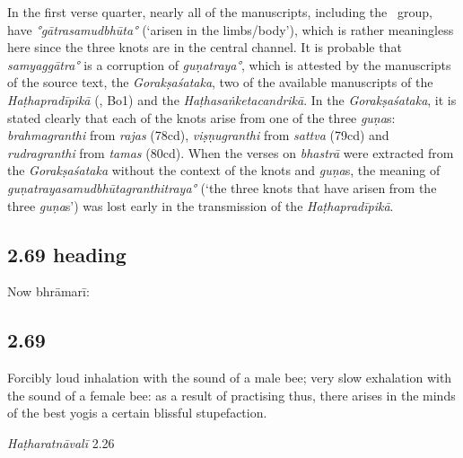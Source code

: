 \begin{ekdosis}
\begin{testimonia}[hp02_068]
\end{testimonia}

\begin{philcomm}[hp02_068]
In the first verse quarter, nearly all of the manuscripts, including the \textalpha\ group, have \emph{°gātrasamudbhūta°} (`arisen in the limbs/body'), which is rather meaningless here since the three knots are in the central channel. It is probable that \emph{samyaggātra°} is a corruption of \emph{guṇatraya°}, which is attested by the manuscripts of the source text, the \emph{Gorakṣaśataka}, two of the available manuscripts of the \emph{Haṭhapradīpikā} (, Bo1) and the \emph{Haṭhasaṅketacandrikā}. In the \emph{Gorakṣaśataka}, it is stated clearly that each of the knots arise from one of the three \emph{guṇa}s: \emph{brahmagranthi} from \emph{rajas} (78cd), \emph{viṣṇugranthi} from \emph{sattva} (79cd) and \emph{rudragranthi} from \emph{tamas} (80cd). When the verses on \emph{bhastrā} were extracted from the \emph{Gorakṣaśataka} without the context of the knots and \emph{guṇa}s, the meaning of \emph{guṇa\-traya\-sam\-udbhūta\-granthi\-traya°} (`the three knots that have arisen from the three \emph{guṇa}s') was lost early in the transmission of the \emph{Haṭhapradīpikā}.  
\end{philcomm}

\subsection*{2.69 heading}
\begin{translation}[hp02_069a]
Now bhrāmarī:
\end{translation}


\subsection*{2.69}
\begin{translation}[hp02_069]
Forcibly loud inhalation with the sound of a male bee; very slow exhalation with the sound of a female bee: as a result of practising thus, there arises in the minds of the best yogis a certain blissful stupefaction.
\end{translation}

\begin{testimonia}[hp02_069]
\emph{Haṭharatnāvalī} 2.26


\end{testimonia}
\end{ekdosis}

